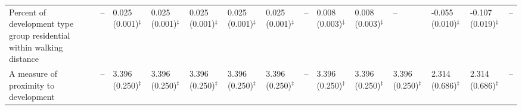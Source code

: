 \begin{tabular}{p{3in}p{0.5in}p{0.5in}p{0.5in}p{0.5in}p{0.5in}p{0.5in}p{0.5in}p{0.5in}p{0.5in}p{0.5in}p{0.5in}p{0.5in}p{0.5in}}
Percent of development type group residential within walking distance & -- & 0.025 (0.001)$^{\ddagger}$ & 0.025 (0.001)$^{\ddagger}$ & 0.025 (0.001)$^{\ddagger}$ & 0.025 (0.001)$^{\ddagger}$ & 0.025 (0.001)$^{\ddagger}$ & -- & 0.008 (0.003)$^{\ddagger}$ & 0.008 (0.003)$^{\ddagger}$ & -- & -0.055 (0.010)$^{\ddagger}$ & -0.107 (0.019)$^{\ddagger}$ & -- \\
A measure of proximity to development & -- & 3.396 (0.250)$^{\ddagger}$ & 3.396 (0.250)$^{\ddagger}$ & 3.396 (0.250)$^{\ddagger}$ & 3.396 (0.250)$^{\ddagger}$ & 3.396 (0.250)$^{\ddagger}$ & -- & 3.396 (0.250)$^{\ddagger}$ & 3.396 (0.250)$^{\ddagger}$ & 3.396 (0.250)$^{\ddagger}$ & 2.314 (0.686)$^{\ddagger}$ & 2.314 (0.686)$^{\ddagger}$ & -- \\
\hline\hline
\end{tabular}
